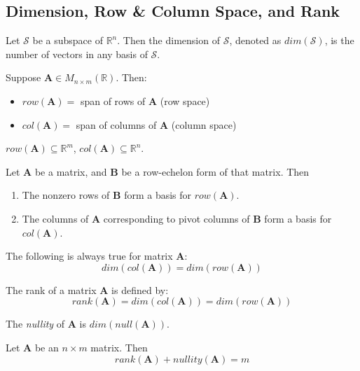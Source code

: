 \subsection{Dimension, Row \& Column Space, and Rank}
\begin{definition}[Dimension]
Let $\mathcal{S}$ be a subspace of $\mathbb{R}^n$. Then the dimension of $\mathcal{S}$, denoted as $dim(\mathcal{S})$, is the number of vectors in any basis of $\mathcal{S}$.
\end{definition}

\begin{definition}
Suppose $\bm{A}\in M_{n\times m}(\mathbb{R})$. Then:
\begin{itemize}
    \item $row(\bm{A})=$ span of rows of $\bm{A}$ (row space)
    \item $col(\bm{A})=$ span of columns of $\bm{A}$ (column space)
\end{itemize}
$row(\bm{A})\subseteq\mathbb{R}^m$, $col(\bm{A})\subseteq\mathbb{R}^n$.
\end{definition}

\begin{theorem}
Let $\bm{A}$ be a matrix, and $\bm{B}$ be a row-echelon form of that matrix. Then
\begin{enumerate}[label=\alph*)]
    \item The nonzero rows of $\bm{B}$ form a basis for $row(\bm{A})$.
    \item The columns of $\bm{A}$ corresponding to pivot columns of $\bm{B}$ form a basis for $col(\bm{A})$.
\end{enumerate}
\end{theorem}

\begin{theorem}
The following is always true for matrix $\bm{A}$:
\begin{equation}
    dim(col(\bm{A})) = dim(row(\bm{A}))
\end{equation}
\end{theorem}

\begin{definition}[Rank]
The rank of a matrix $\bm{A}$ is defined by:
\begin{equation}
    rank(\bm{A}) = dim(col(\bm{A})) = dim(row(\bm{A}))
\end{equation}
\end{definition}

\begin{definition}[Nullity]
The \emph{nullity} of $\bm{A}$ is $dim(null(\bm{A}))$.
\end{definition}

\begin{theorem}
Let $\bm{A}$ be an $n\times m$ matrix. Then
\begin{equation}
    rank(\bm{A}) + nullity(\bm{A})=m
\end{equation}
\end{theorem}
